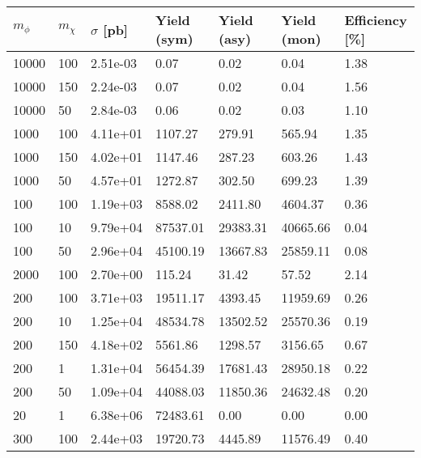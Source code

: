 \begin{table}
\renewcommand{\arraystretch}{1.0}
\small
\centering
\begin{tabular}{lllllll}
\hline
$m_\phi$ & $m_\chi$ & $\sigma$ [pb] & Yield (sym) & Yield (asy) & Yield (mon) & Efficiency [\%] \\ \hline
10000     &   100       &   2.51e-03  &   0.07      &   0.02      &   0.04      &   1.38      \\ 
10000     &   150       &   2.24e-03  &   0.07      &   0.02      &   0.04      &   1.56      \\ 
10000     &   50        &   2.84e-03  &   0.06      &   0.02      &   0.03      &   1.10      \\ 
1000      &   100       &   4.11e+01  &   1107.27   &   279.91    &   565.94    &   1.35      \\ 
1000      &   150       &   4.02e+01  &   1147.46   &   287.23    &   603.26    &   1.43      \\ 
1000      &   50        &   4.57e+01  &   1272.87   &   302.50    &   699.23    &   1.39      \\ 
100       &   100       &   1.19e+03  &   8588.02   &   2411.80   &   4604.37   &   0.36      \\ 
100       &   10        &   9.79e+04  &   87537.01  &   29383.31  &   40665.66  &   0.04      \\ 
100       &   50        &   2.96e+04  &   45100.19  &   13667.83  &   25859.11  &   0.08      \\ 
2000      &   100       &   2.70e+00  &   115.24    &   31.42     &   57.52     &   2.14      \\ 
200       &   100       &   3.71e+03  &   19511.17  &   4393.45   &   11959.69  &   0.26      \\ 
200       &   10        &   1.25e+04  &   48534.78  &   13502.52  &   25570.36  &   0.19      \\ 
200       &   150       &   4.18e+02  &   5561.86   &   1298.57   &   3156.65   &   0.67      \\ 
200       &   1         &   1.31e+04  &   56454.39  &   17681.43  &   28950.18  &   0.22      \\ 
200       &   50        &   1.09e+04  &   44088.03  &   11850.36  &   24632.48  &   0.20      \\ 
20        &   1         &   6.38e+06  &   72483.61  &   0.00      &   0.00      &   0.00      \\ 
300       &   100       &   2.44e+03  &   19720.73  &   4445.89   &   11576.49  &   0.40      \\ 

\end{tabular}
\end{table}
